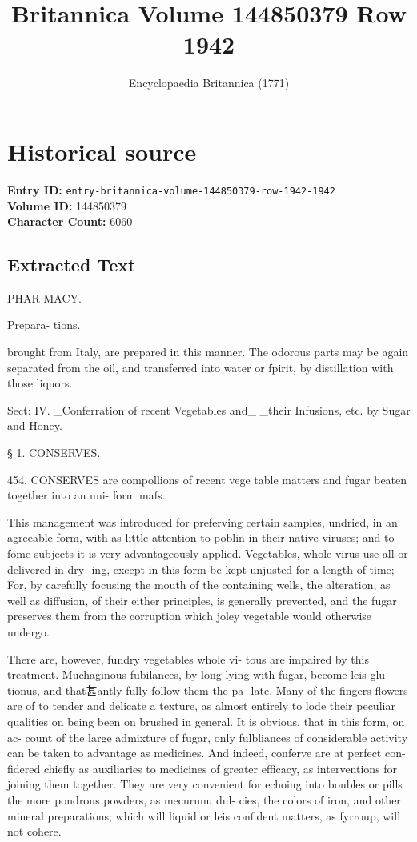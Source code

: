 \documentclass{article}
\title{Britannica Volume 144850379 Row 1942}
\date{Encyclopaedia Britannica (1771)}
\begin{document}
\maketitle

\section*{Historical source}
\textbf{Entry ID:} \texttt{entry-britannica-volume-144850379-row-1942-1942} \\
\textbf{Volume ID:} 144850379 \\
\textbf{Character Count:} 6060

\subsection*{Extracted Text}
PHAR MACY.

Prepara-
tions.

brought from Italy, are prepared in this manner. The
odorous parts may be again separated from the oil,
and transferred into water or fpirit, by distillation with
those liquors.

Sect: IV. \_Conferration of recent Vegetables and\_
\_their Infusions, etc. by Sugar and Honey.\_

§ 1. CONSERVES.

454. CONSERVES are compollions of recent vege
table matters and fugar beaten together into an uni-
form mafs.

This management was introduced for preferving
certain samples, undried, in an agreeable form, with
as little attention to poblin in their native viruses;
and to fome subjects it is very advantageously applied.
Vegetables, whole virus use all or delivered in dry-
ing, except in this form be kept unjusted for a length
of time; For, by carefully focusing the mouth of the
containing wells, the alteration, as well as diffusion,
of their either principles, is generally prevented, and
the fugar preserves them from the corruption which
joley vegetable would otherwise undergo.

There are, however, fundry vegetables whole vi-
tous are impaired by this treatment. Muchaginous
fubilances, by long lying with fugar, become leis glu-
tionus, and that甚antly fully follow them the pa-
late. Many of the fingers flowers are of to tender
and delicate a texture, as almost entirely to lode their
peculiar qualities on being been on brushed
in general. It is obvious, that in this form, on ac-
count of the large admixture of fugar, only fulbliances
of considerable activity can be taken to advantage as
medicines. And indeed, conferve are at perfect con-
fidered chiefly as auxiliaries to medicines of greater
efficacy, as interventions for joining them together.
They are very convenient for echoing into boubles or
pills the more pondrous powders, as mecurunu dul-
cies, the colors of iron, and other mineral preparations;
which will liquid or leis confident matters, as fyrroup,
will not cohere.
\end{document}
